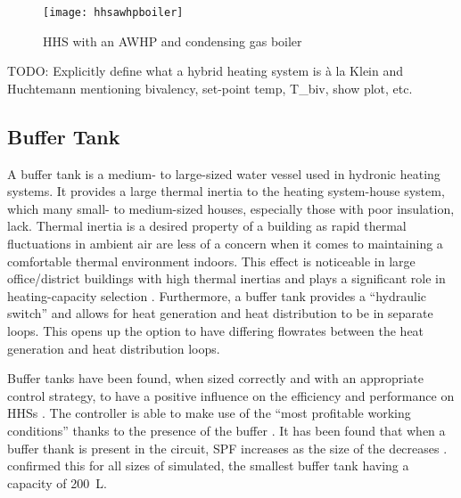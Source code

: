 \begin{figure}[htb]
    \centering
    \texttt{[image: hhsawhpboiler]}
    \caption{\acs{HHS} with an \acs{AWHP} and condensing gas boiler \cite{dongellini_influence_2021}}
    \label{fig:hhsawhpboilerdiagram}
\end{figure}

TODO: Explicitly define what a hybrid heating system is à la Klein and Huchtemann mentioning bivalency, set-point temp, T_biv, show plot, etc. 



\subsection{Buffer Tank} 
A buffer tank is a medium- to large-sized water vessel used in hydronic heating systems. It provides a large thermal inertia to the heating system-house system, which many small- to medium-sized houses, especially those with poor insulation, lack. Thermal inertia is a desired property of a building as rapid thermal fluctuations in ambient air are less of a concern when it comes to maintaining a comfortable thermal environment indoors. This effect is noticeable in large office/district buildings with high thermal inertias and plays a significant role in heating-capacity selection \cite{owen_ashrae_2009}. Furthermore, a buffer tank provides a ``hydraulic switch'' and allows for heat generation and heat distribution to be in separate loops. This opens up the option to have differing flowrates between the heat generation and heat distribution loops. 

Buffer tanks have been found, when sized correctly and with an appropriate control strategy, to have a positive influence on the efficiency and performance on \acp{HHS} \cite{klein_numerical_2014,roccatello_analysis_2022}. The controller is able to make use of the \HPs ``most profitable working conditions'' thanks to the presence of the buffer \cite{dettorre_economic_2018}. It has been found that when a buffer thank is present in the \HP circuit, \ac{SPF} increases as the size of the \HP decreases \cite{mugnini_variable-load_2021}. \citeauthor{mugnini_variable-load_2021} confirmed this for all sizes of \HPs simulated, the smallest buffer tank having a capacity of \SI{200}{\liter}. 

